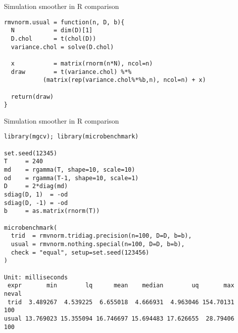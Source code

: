 \documentclass[notes,blackandwhite,mathsans,usenames,dvipsnames]{beamer}
\begin{document}
\begin{frame}[fragile]{Simulation smoother in R {\color{purple}comparison}}

\begin{verbatim}
rmvnorm.usual = function(n, D, b){
  N           = dim(D)[1]
  D.chol      = t(chol(D))
  variance.chol = solve(D.chol)
  
  x           = matrix(rnorm(n*N), ncol=n)
  draw        = t(variance.chol) %*% 
           (matrix(rep(variance.chol%*%b,n), ncol=n) + x)
  
  return(draw)
}
\end{verbatim}

\end{frame}





\begin{frame}[fragile]{Simulation smoother in R {\color{purple}comparison}}

\footnotesize
\begin{verbatim}
library(mgcv); library(microbenchmark)

set.seed(12345)
T     = 240
md    = rgamma(T, shape=10, scale=10)
od    = rgamma(T-1, shape=10, scale=1)
D     = 2*diag(md)
sdiag(D, 1)  = -od
sdiag(D, -1) = -od
b     = as.matrix(rnorm(T))

microbenchmark(
  trid  = rmvnorm.tridiag.precision(n=100, D=D, b=b),
  usual = rmvnorm.nothing.special(n=100, D=D, b=b),
  check = "equal", setup=set.seed(123456)
)

Unit: milliseconds
 expr       min        lq      mean    median        uq       max neval
 trid  3.489267  4.539225  6.655018  4.666931  4.963046 154.70131   100
usual 13.769023 15.355094 16.746697 15.694483 17.626655  28.79406   100
\end{verbatim}

\end{frame}
\end{document}
